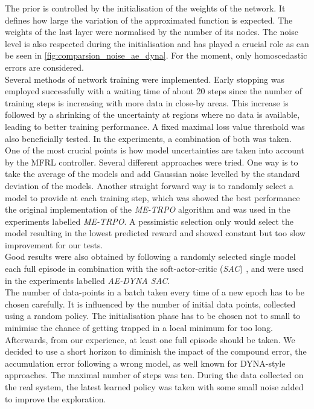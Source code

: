 \documentclass[
reprint,
amsmath,amssymb,amsfonts,clevref,
aps,
prstab,
]{revtex4-2}
\begin{document}
The prior is controlled by the initialisation of the weights of the network. It defines how large the variation of the approximated function is expected. The weights of the last layer were normalised by the number of its nodes. The noise level is also respected during the initialisation and has played a crucial role as can be seen in \cref{fig:comparsion_noise_ae_dyna}. For the moment, only homoscedastic errors are considered.\\
Several methods of network training were implemented. Early stopping was employed successfully with a waiting time of about 20 steps since the number of training steps is increasing with more data in close-by areas. This increase is followed by a shrinking of the uncertainty at regions where no data is available, leading to better training performance. A fixed maximal loss value threshold was also beneficially tested. In the experiments, a combination of both was taken.\\
One of the most crucial points is how model uncertainties are taken into account by the MFRL controller. Several different approaches were tried. One way is to take the average of the models and add Gaussian noise levelled by the standard deviation of the models. Another straight forward way is to randomly select a model to provide at each training step, which was showed the best performance the original implementation of the \emph{ME-TRPO} algorithm and was used in the experiments labelled \emph{ME-TRPO}. A pessimistic selection only would select the model resulting in the lowest predicted reward and showed constant but too slow improvement for our tests.
\\ Good results were also obtained by following a randomly selected single model each full episode in combination with the soft-actor-critic (\emph{SAC}) \cite{fujimoto2018addressing,Hill2018}, and were used in the experiments labelled \emph{AE-DYNA SAC}. \\
The number of data-points in a batch taken every time of a new epoch has to be chosen carefully. It is influenced by the number of initial data points, collected using a random policy. The initialisation phase has to be chosen not to small to minimise the chance of getting trapped in a local minimum for too long. Afterwards, from our experience, at least one full episode should be taken. We decided to use a short horizon to diminish the impact of the compound error, the accumulation error following a wrong model, as well known for DYNA-style approaches. The maximal number of steps was ten. During the data collected on the real system, the latest learned policy was taken with some small noise added to improve the exploration.\\
\end{document}
